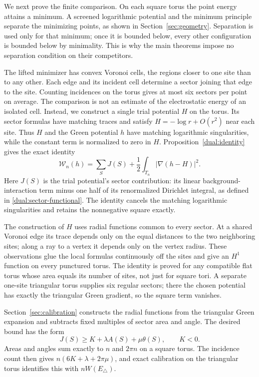 We next prove the finite comparison.  On each square torus the point
energy attains a minimum.  A screened logarithmic potential and the
minimum principle separate the minimizing points, as shown in
Section~\ref{sec:geometry}.  Separation is used only for that minimum;
once it is bounded below, every other configuration is bounded below by
minimality.  This is why the main theorems impose no separation condition
on their competitors.

The lifted minimizer has convex Voronoi cells, the regions closer to
one site than to any other.  Each edge and its incident cell determine
a sector joining that edge to the site.  Counting incidences on the
torus gives at most six sectors per point on average.  The comparison is
not an estimate of the electrostatic energy of an isolated cell.
Instead, we construct a single trial potential $H$ on the torus. Its
sector formulas have matching traces and satisfy $H=-\log r+O(r^2)$
near each site. Thus $H$ and the Green potential $h$ have matching
logarithmic singularities, while the constant term is normalized to
zero in $H$. Proposition~\ref{dual:identity} gives the exact identity
\[
 \mathcal W_n(h)
 =\sum_S J(S)+\frac12\int_{T_n}|\nabla(h-H)|^2.
\]
Here $J(S)$ is the trial potential's sector contribution: its linear
background-interaction term minus one half of its renormalized Dirichlet
integral, as defined in \eqref{dual:sector-functional}. The identity
cancels the matching logarithmic singularities and retains the
nonnegative square exactly.

The construction of $H$ uses radial functions common to every sector.
At a shared Voronoi edge its trace depends only on the equal distances
to the two neighboring sites; along a ray to a vertex it depends only
on the vertex radius.  These observations glue the local formulas
continuously off the sites and give an $H^1$ function on every punctured
torus. The identity is proved for any compatible flat torus whose area
equals its number of sites, not just for square tori. A separate
one-site triangular torus supplies six regular sectors; there the chosen
potential has exactly the triangular Green gradient, so the square term
vanishes.

Section~\ref{sec:calibration} constructs the radial functions from the
triangular Green expansion and subtracts fixed multiples of sector area
and angle.  The desired bound has the form
\[
 J(S)\ge K+\lambda A(S)+\mu\theta(S),\qquad K<0.
\]
Areas and angles sum exactly to $n$ and $2\pi n$ on a square torus.
The incidence count then gives $n(6K+\lambda+2\pi\mu)$, and exact
calibration on the triangular torus identifies this with
$nW(E_\triangle)$.

